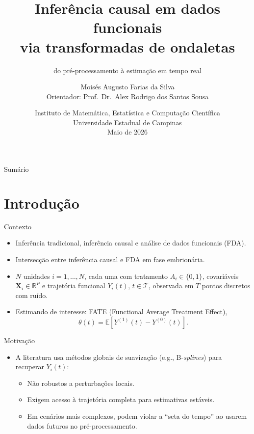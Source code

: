 \documentclass{beamer}
\title{Inferência causal em dados funcionais\\via transformadas de ondaletas}
\subtitle{do pré-processamento à estimação em tempo real}
\author{Moisés Augusto Farias da Silva \\ {\small Orientador: Prof.\ Dr.\ Alex Rodrigo dos Santos Sousa}}
\date{Instituto de Matemática, Estatística e Computação Científica \\ Universidade Estadual de Campinas \\ Maio de 2026}
\begin{document}
\maketitle

\begin{frame}{Sumário}
    \tableofcontents[hideallsubsections]
\end{frame}

\section{Introdução}

\begin{frame}{Contexto}
\begin{itemize}
    \item Inferência tradicional, inferência causal e análise de dados funcionais (FDA).
    \item Intersecção entre inferência causal e FDA em fase embrionária.
    \item \(N\) unidades \(i = 1, \ldots, N\), cada uma com tratamento \(A_i \in \{0,1\}\), covariáveis \(\mathbf{X}_i \in \mathbb{R}^P\) e trajetória funcional \(Y_i(t)\), \(t \in \mathcal{T}\), observada em \(T\) pontos discretos com ruído.
    \item Estimando de interesse: FATE (Functional Average Treatment Effect),
    \[
        \theta(t) = \mathbb{E}[Y^{(1)}(t) - Y^{(0)}(t)].
    \]
\end{itemize}
\end{frame}

\begin{frame}{Motivação}
\begin{itemize}
    \item A literatura usa métodos globais de suavização (e.g., B-\textit{splines}) para recuperar \(Y_i(t)\):
    \begin{itemize}
        \item Não robustos a perturbações locais.
        \item Exigem acesso à trajetória completa para estimativas estáveis.
        \item Em cenários mais complexos, podem violar a ``seta do tempo'' ao usarem dados futuros no pré-processamento.
    \end{itemize}
\end{itemize}
\end{frame}
\end{document}

